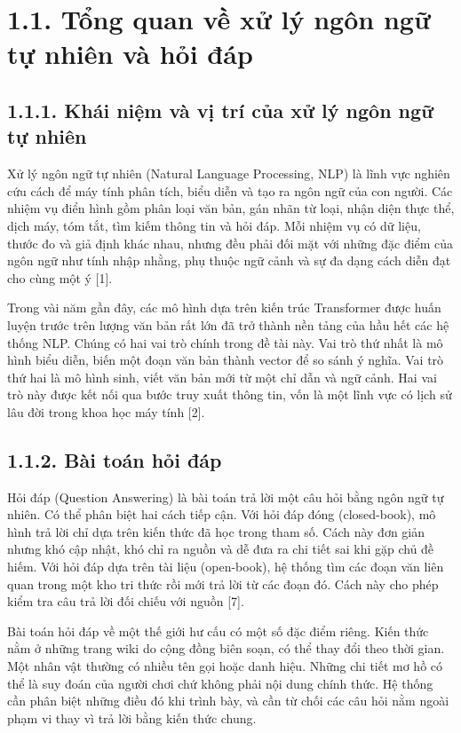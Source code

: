 
\section{1.1. Tổng quan về xử lý ngôn ngữ tự nhiên và hỏi đáp}

\subsection{1.1.1. Khái niệm và vị trí của xử lý ngôn ngữ tự nhiên}

Xử lý ngôn ngữ tự nhiên (Natural Language Processing, NLP) là lĩnh vực nghiên cứu cách để máy tính phân tích, biểu diễn và tạo ra ngôn ngữ của con người. Các nhiệm vụ điển hình gồm phân loại văn bản, gán nhãn từ loại, nhận diện thực thể, dịch máy, tóm tắt, tìm kiếm thông tin và hỏi đáp. Mỗi nhiệm vụ có dữ liệu, thước đo và giả định khác nhau, nhưng đều phải đối mặt với những đặc điểm của ngôn ngữ như tính nhập nhằng, phụ thuộc ngữ cảnh và sự đa dạng cách diễn đạt cho cùng một ý [1].


Trong vài năm gần đây, các mô hình dựa trên kiến trúc Transformer được huấn luyện trước trên lượng văn bản rất lớn đã trở thành nền tảng của hầu hết các hệ thống NLP. Chúng có hai vai trò chính trong đề tài này. Vai trò thứ nhất là mô hình biểu diễn, biến một đoạn văn bản thành vector để so sánh ý nghĩa. Vai trò thứ hai là mô hình sinh, viết văn bản mới từ một chỉ dẫn và ngữ cảnh. Hai vai trò này được kết nối qua bước truy xuất thông tin, vốn là một lĩnh vực có lịch sử lâu đời trong khoa học máy tính [2].


\subsection{1.1.2. Bài toán hỏi đáp}

Hỏi đáp (Question Answering) là bài toán trả lời một câu hỏi bằng ngôn ngữ tự nhiên. Có thể phân biệt hai cách tiếp cận. Với hỏi đáp đóng (closed-book), mô hình trả lời chỉ dựa trên kiến thức đã học trong tham số. Cách này đơn giản nhưng khó cập nhật, khó chỉ ra nguồn và dễ đưa ra chi tiết sai khi gặp chủ đề hiếm. Với hỏi đáp dựa trên tài liệu (open-book), hệ thống tìm các đoạn văn liên quan trong một kho tri thức rồi mới trả lời từ các đoạn đó. Cách này cho phép kiểm tra câu trả lời đối chiếu với nguồn [7].


Bài toán hỏi đáp về một thế giới hư cấu có một số đặc điểm riêng. Kiến thức nằm ở những trang wiki do cộng đồng biên soạn, có thể thay đổi theo thời gian. Một nhân vật thường có nhiều tên gọi hoặc danh hiệu. Những chi tiết mơ hồ có thể là suy đoán của người chơi chứ không phải nội dung chính thức. Hệ thống cần phân biệt những điều đó khi trình bày, và cần từ chối các câu hỏi nằm ngoài phạm vi thay vì trả lời bằng kiến thức chung.



